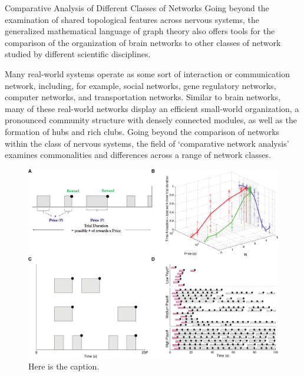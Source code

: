\documentclass[NETN,manuscript]{stjour-new}
\begin{document}
\begin{boxedtext}{Comparative Analysis of Different Classes of Networks} 
Going beyond the examination of shared topological features across
nervous systems, the generalized mathematical language of graph theory
also offers tools for the comparison of the organization of brain
networks to other classes of network studied
by different scientific
disciplines. 

Many real-world systems operate as some sort of
interaction or communication network, including, for example, social
networks, gene regulatory networks, computer networks, and
transportation networks. Similar to brain networks, many of these
real-world networks display an efficient small-world organization, a
pronounced community structure with densely connected modules, as well
as the formation of hubs and rich clubs. Going beyond the
comparison of networks within the class of nervous systems, the field
of `comparative network analysis' examines commonalities and
differences across a range of network classes.

\begin{figure}
\includegraphics[width=\hsize]{Fig1}
\caption{Here is the caption.}
\end{figure}
\end{boxedtext}
\end{document}
